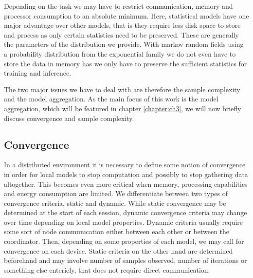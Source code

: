 Depending on the task we may have to restrict communication, memory and processor consumption to an absolute minimum.
Here, statistical models have one major advantage over other models, that is they require less disk space to store and process as only certain statistics need to be preserved.
These are generally the parameters of the distribution we provide.
With markov random fields using a probability distribution from the exponential family we do not even have to store the data in memory has we only have to preserve the sufficient statistics for training and inference.

The two major issues we have to deal with are therefore the sample complexity and the model aggregation.
As the main focus of this work is the model aggregation, which will be featured in chapter \ref{chapter:ch3}, we will now briefly discuss convergence and sample complexity.

\subsection{Convergence}
In a distributed environment it is necessary to define some notion of convergence in order for local models to stop computation and possibly to stop gathering data altogether.
This becomes even more critical when memory, processing capabilities and energy consumption are limited.
We differentiate between two types of convergence criteria, static and dynamic.
While static convergence may be determined at the start of each session, dynamic convergence criteria may change over time depending on local model properties.
Dynamic criteria usually require some sort of node communication either between each other or between the coordinator. 
Then, depending on some properties of each model, we may call for convergence on each device.
Static criteria on the other hand are determined beforehand and may involve number of samples observed, number of iterations or something else enteriely, that does not require direct communication.

